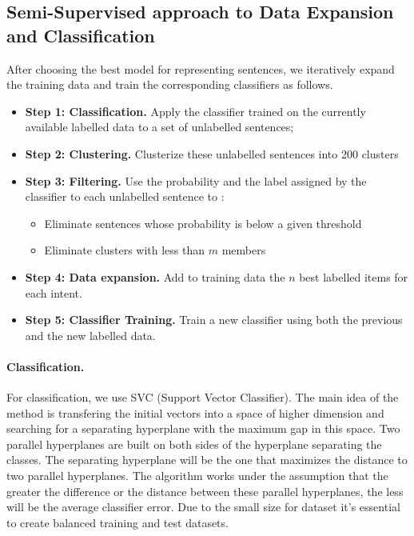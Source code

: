 \documentclass[11pt]{article}
\begin{document}
\subsection{Semi-Supervised approach to Data Expansion and Classification}
\label{subsec:dataexpansion}

After choosing the best model for representing sentences, we
iteratively expand the training data and train the corresponding
classifiers as follows.


\begin{itemize}
\item \textbf{Step 1: Classification.} Apply the classifier trained on the currently available labelled data to a set of unlabelled sentences;
\item \textbf{Step 2: Clustering.} Clusterize these unlabelled sentences into 200 clusters
\item \textbf{Step 3: Filtering.} Use the probability and the label assigned by the classifier to each unlabelled sentence to :
  \begin{itemize}
\item Eliminate sentences whose probability is below a given threshold
\item Eliminate clusters with less than $m$ members
  \end{itemize}
\item \textbf{Step 4: Data expansion.} Add to training data the $n$ best labelled items for each intent. 
  \item \textbf{Step 5: Classifier Training.} Train a new classifier using both the previous and the new labelled data. 
\end{itemize}

\paragraph{Classification.} For classification, we use SVC (Support Vector Classifier). The main idea of ​​the method is transfering the initial vectors into a space of higher dimension and searching for a separating hyperplane with the maximum gap in this space. Two parallel hyperplanes are built on both sides of the hyperplane separating the classes. The separating hyperplane will be the one that maximizes the distance to two parallel hyperplanes. The algorithm works under the assumption that the greater the difference or the distance between these parallel hyperplanes, the less will be the average classifier error.  Due to the small size for dataset it's essential to create balanced training and test datasets.
\end{document}
